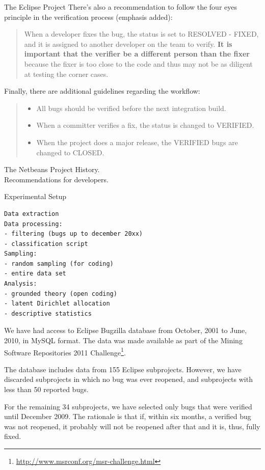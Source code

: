 \begin{subsection}{The Eclipse Project}
There’s also a recommendation to follow the four eyes principle in the verification process (emphasis added):

\begin{quote}
When a developer fixes the bug, the status is set to RESOLVED - FIXED, and it is assigned to another developer on the team to verify. \textbf{It is important that the verifier be a different person than the fixer} because the fixer is too close to the code and thus may not be as diligent at testing the corner cases.
\end{quote}

Finally, there are additional guidelines regarding the workflow:

\begin{quote}
	\begin{itemize}
\item All bugs should be verified before the next integration build.

\item When a committer verifies a fix, the status is changed to VERIFIED.

\item When the project does a major release, the VERIFIED bugs are changed to CLOSED.
	\end{itemize}
\end{quote}
\end{subsection}

  \begin{subsection}{The Netbeans Project}
History. \\
Recommendations for developers.
\end{subsection}

\begin{section}{Experimental Setup}

\begin{verbatim}
Data extraction
Data processing: 
- filtering (bugs up to december 20xx)
- classification script
Sampling:
- random sampling (for coding)
- entire data set
Analysis:
- grounded theory (open coding)
- latent Dirichlet allocation
- descriptive statistics
\end{verbatim}

We have had access to Eclipse Bugzilla database from October, 2001 to June, 2010, in MySQL format. The data was made available as part of the Mining Software Repositories 2011 Challenge\footnote{\url{http://www.msrconf.org/msr-challenge.html}}.

The database includes data from 155 Eclipse subprojects. However, we have discarded subprojects in which no bug was ever reopened, and subprojects with less than 50 reported bugs.

For the remaining 34 subprojects, we have selected only bugs that were verified until December 2009. The rationale is that if, within six months, a verified bug was not reopened, it probably will not be reopened after that and it is, thus, fully fixed.
\end{section}

